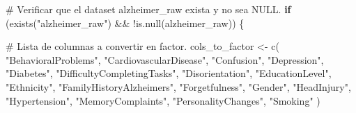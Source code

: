 \documentclass[
  letterpaper,
  DIV=11,
  numbers=noendperiod]{scrartcl}
\newenvironment{Shaded}{\begin{snugshade}}{\end{snugshade}}
\newcommand{\CommentTok}[1]{\textcolor[rgb]{0.37,0.37,0.37}{#1}}
\newcommand{\ControlFlowTok}[1]{\textcolor[rgb]{0.00,0.23,0.31}{\textbf{#1}}}
\newcommand{\FunctionTok}[1]{\textcolor[rgb]{0.28,0.35,0.67}{#1}}
\newcommand{\NormalTok}[1]{\textcolor[rgb]{0.00,0.23,0.31}{#1}}
\newcommand{\OtherTok}[1]{\textcolor[rgb]{0.00,0.23,0.31}{#1}}
\newcommand{\SpecialCharTok}[1]{\textcolor[rgb]{0.37,0.37,0.37}{#1}}
\newcommand{\StringTok}[1]{\textcolor[rgb]{0.13,0.47,0.30}{#1}}
\begin{document}
\begin{Shaded}
\begin{Highlighting}[]
\CommentTok{\# Verificar que el dataset \textquotesingle{}alzheimer\_raw\textquotesingle{} exista y no sea NULL.}
\ControlFlowTok{if}\NormalTok{ (}\FunctionTok{exists}\NormalTok{(}\StringTok{"alzheimer\_raw"}\NormalTok{) }\SpecialCharTok{\&\&} \SpecialCharTok{!}\FunctionTok{is.null}\NormalTok{(alzheimer\_raw)) \{}
 
  \CommentTok{\# Lista de columnas a convertir en factor.}
\NormalTok{  cols\_to\_factor }\OtherTok{\textless{}{-}} \FunctionTok{c}\NormalTok{(}
  \StringTok{"BehavioralProblems"}\NormalTok{,       }\StringTok{"CardiovascularDisease"}\NormalTok{,}
  \StringTok{"Confusion"}\NormalTok{,                }\StringTok{"Depression"}\NormalTok{,}
  \StringTok{"Diabetes"}\NormalTok{,                 }\StringTok{"DifficultyCompletingTasks"}\NormalTok{,}
  \StringTok{"Disorientation"}\NormalTok{,           }\StringTok{"EducationLevel"}\NormalTok{,}
  \StringTok{"Ethnicity"}\NormalTok{,                }\StringTok{"FamilyHistoryAlzheimers"}\NormalTok{,}
  \StringTok{"Forgetfulness"}\NormalTok{,            }\StringTok{"Gender"}\NormalTok{,}
  \StringTok{"HeadInjury"}\NormalTok{,               }\StringTok{"Hypertension"}\NormalTok{,}
  \StringTok{"MemoryComplaints"}\NormalTok{,         }\StringTok{"PersonalityChanges"}\NormalTok{,}
  \StringTok{"Smoking"}
\NormalTok{)}
  

\end{Highlighting}
\end{Shaded}
\end{document}
